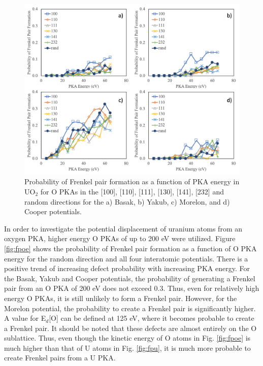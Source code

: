 \documentclass[review]{elsarticle}
\providecommand{\DIFaddbeginFL}{} %
\providecommand{\DIFaddendFL}{} %
\providecommand{\DIFdelbeginFL}{} %
\providecommand{\DIFdelendFL}{} %
\newcommand{\DIFscaledelfig}{0.5}
\newlength{\DIFdelgraphicswidth} %
\newlength{\DIFdelgraphicsheight} %
\newcommand{\DIFaddincludegraphics}[2][]{{\color{blue}\fbox{\DIFOincludegraphics[#1]{#2}}}} %
\newcommand{\DIFdelincludegraphics}[2][]{%
\sbox{\DIFdelgraphicsbox}{\DIFOincludegraphics[#1]{#2}}%
\settoboxwidth{\DIFdelgraphicswidth}{\DIFdelgraphicsbox} %
\settoboxtotalheight{\DIFdelgraphicsheight}{\DIFdelgraphicsbox} %
\scalebox{\DIFscaledelfig}{%
\parbox[b]{\DIFdelgraphicswidth}{\usebox{\DIFdelgraphicsbox}\\[-\baselineskip] \rule{\DIFdelgraphicswidth}{0em}}\llap{\resizebox{\DIFdelgraphicswidth}{\DIFdelgraphicsheight}{%
\setlength{\unitlength}{\DIFdelgraphicswidth}%
\begin{picture}(1,1)%
\thicklines\linethickness{2pt} %
{\color[rgb]{1,0,0}\put(0,0){\framebox(1,1){}}}%
{\color[rgb]{1,0,0}\put(0,0){\line( 1,1){1}}}%
{\color[rgb]{1,0,0}\put(0,1){\line(1,-1){1}}}%
\end{picture}%
}\hspace*{3pt}}} %
} %
\DeclareRobustCommand{\DIFaddbeginFL}{\DIFOaddbeginFL \let\includegraphics\DIFaddincludegraphics} %
\DeclareRobustCommand{\DIFaddendFL}{\DIFOaddendFL \let\includegraphics\DIFOincludegraphics} %
\DeclareRobustCommand{\DIFdelbeginFL}{\DIFOdelbeginFL \let\includegraphics\DIFdelincludegraphics} %
\DeclareRobustCommand{\DIFdelendFL}{\DIFOaddendFL \let\includegraphics\DIFOincludegraphics} %
\begin{document}
\begin{figure}[h]
 \centering
 \DIFdelbeginFL %
\DIFdelendFL \DIFaddbeginFL \includegraphics[width=1.0\textwidth]{FP_O.png}
 \DIFaddendFL \caption{Probability of Frenkel pair formation as a function of PKA energy in UO$_2$ for O PKAs in the [100], [110], [111], [130], [141], [232] and random directions for the a) Basak, b) Yakub, c) Morelon, and d) Cooper potentials. }
 \label{fig:fpo}
\end{figure}

\FloatBarrier

In order to investigate the potential displacement of uranium atoms from an oxygen PKA, higher energy O PKAs of up to 200 eV were utilized. Figure \ref{fig:fpoe} shows the probability of Frenkel pair formation as a function of O PKA energy for the random direction and all four interatomic potentials. There is a positive trend of increasing defect probability with increasing PKA energy. For the Basak, Yakub and Cooper potentials, the probability of generating a Frenkel pair from an O PKA of 200 eV does not exceed 0.3. Thus, even for relatively high energy O PKAs, it is still unlikely to form a Frenkel pair. However, for the Morelon potential, the probability to create a Frenkel pair is significantly higher. A value for E$_d$[O] can be defined at 125 eV, where it becomes probable to create a Frenkel pair. It should be noted that these defects are almost entirely on the O sublattice. Thus, even though the kinetic energy of O atoms in Fig. \ref{fig:fpoe} is much higher than that of U atoms in Fig. \ref{fig:fpu}, it is much more probable to create Frenkel pairs from a U PKA.
\end{document}
